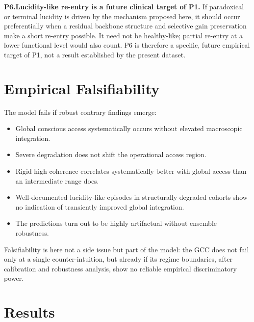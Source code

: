 \documentclass[11pt,a4paper]{article}
\theoremstyle{plain}
\theoremstyle{definition}
\theoremstyle{remark}
\begin{document}
\medskip
\noindent\textbf{P6.\;Lucidity-like re-entry is a future clinical target of P1.}\quad
If paradoxical or terminal lucidity is driven by the mechanism proposed here, it should occur preferentially when a residual backbone structure and selective gain preservation make a short re-entry possible. It need not be healthy-like; partial re-entry at a lower functional level would also count. P6 is therefore a specific, future empirical target of P1, not a result established by the present dataset.


\section{Empirical Falsifiability}
\label{sec:falsifizierbarkeit}

The model fails if robust contrary findings emerge:
\begin{itemize}
\item Global conscious access systematically occurs without elevated macroscopic integration.
\item Severe degradation does not shift the operational access region.
\item Rigid high coherence correlates systematically better with global access than an intermediate range does.
\item Well-documented lucidity-like episodes in structurally degraded cohorts show no indication of transiently improved global integration.
\item The predictions turn out to be highly artifactual without ensemble robustness.
\end{itemize}

Falsifiability is here not a side issue but part of the model: the GCC does not fail only at a single counter-intuition, but already if its regime boundaries, after calibration and robustness analysis, show no reliable empirical discriminatory power.


\section*{Results}
\end{document}
